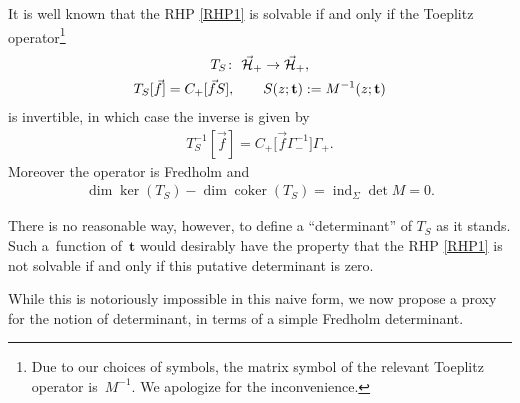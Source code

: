 \documentclass[pdftex]{sigma}
\numberwithin{equation}{section}
\def \G{\Gamma}
\def\H{{\cal H}}
\def \t{\mathbf t}
\begin{document}
It is well known \cite{Malgrange:IsoDef1} that the RHP \eqref{RHP1} is solvable if and only if the Toeplitz operator\footnote{Due to our choices of symbols, the matrix symbol of the relevant Toeplitz operator is~$M^{-1}$. We apologize for the inconvenience.}
\begin{gather*}
T_{S}\colon \ \vec\H_+\to \vec \H_+,\\
T_{S} [\vec f] = C_+[\vec f S] ,\qquad S(z;\t) := M^{-1}(z;\t)
\end{gather*}
is invertible, in which case the inverse is given by
\begin{gather*}
T_{S}^{-1}[\vec f] = C_+ \big[\vec f \G_-^{-1}\big]\G_+.
\end{gather*}
 Moreover the operator is Fredholm and
\begin{gather*}
\dim \ker (T_S) - \dim \operatorname{coker} (T_S) = \operatorname{ind}_\Sigma \det M =0.
\end{gather*}

There is no reasonable way, however, to def\/ine a ``determinant'' of $T_S$ as it stands. Such a~function of~$\t$ would desirably have the property that the RHP \eqref{RHP1} is not solvable if and only if this putative determinant is zero.

While this is notoriously impossible in this naive form, we now propose a proxy for the notion of determinant, in terms of a simple Fredholm determinant.
\end{document}
